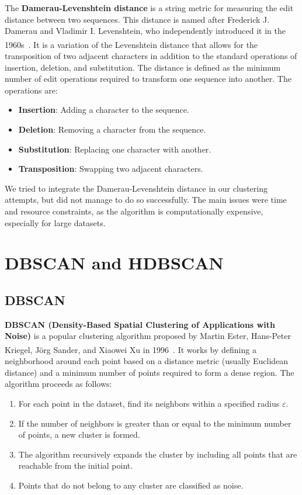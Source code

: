 The \textbf{Damerau-Levenshtein distance} is a string metric for measuring the edit distance between two sequences.
This distance is named after Frederick J. Damerau and Vladimir I. Levenshtein, who independently introduced it in the
1960s~\textsuperscript{\cite{Levenshtein-1966}}. It is a variation of the Levenshtein distance that allows for the
transposition of two adjacent characters in addition to the standard operations of insertion, deletion, and substitution.
The distance is defined as the minimum number of edit operations required to transform one sequence into another.
The operations are:

\begin{itemize}
	\item \textbf{Insertion}: Adding a character to the sequence.
	\item \textbf{Deletion}: Removing a character from the sequence.
	\item \textbf{Substitution}: Replacing one character with another.
	\item \textbf{Transposition}: Swapping two adjacent characters.
\end{itemize}

We tried to integrate the Damerau-Levenshtein distance in our clustering attempts, but did not manage to do so
successfully. The main issues were time and resource constraints, as the algorithm is computationally expensive,
especially for large datasets.

\section{DBSCAN and HDBSCAN}
\label{sec:principle_dbscan_hdbscan}

\subsection*{DBSCAN}
\label{subsec:dbscan}

\textbf{DBSCAN (Density-Based Spatial Clustering of Applications with Noise)} is a popular clustering algorithm proposed
by Martin Ester, Hans-Peter Kriegel, Jörg Sander, and Xiaowei Xu in 1996~\textsuperscript{\cite{Ester-et-al-1996}}.
It works by defining a neighborhood around each point based on a distance metric (usually Euclidean distance) and a
minimum number of points required to form a dense region. The algorithm proceeds as follows:

\begin{enumerate}
	\item For each point in the dataset, find its neighbors within a specified radius $\varepsilon$.
	\item If the number of neighbors is greater than or equal to the minimum number of points, a new cluster is formed.
	\item The algorithm recursively expands the cluster by including all points that are reachable from the initial point.
	\item Points that do not belong to any cluster are classified as noise.
\end{enumerate}

